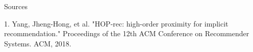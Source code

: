 \documentclass{beamer}
\begin{document}
\begin{frame}{Sources}

\begin{thebibliography}{0}

   1. Yang, Jheng-Hong, et al. "HOP-rec: high-order proximity for implicit recommendation." Proceedings of the 12th ACM Conference on Recommender Systems. ACM, 2018.
  
\end{thebibliography}

\end{frame}

 
 
 
\end{document}
